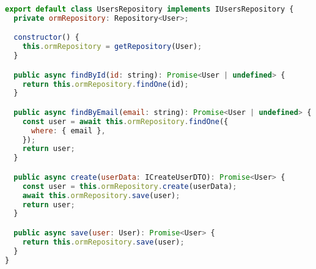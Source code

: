 \begin{lstlisting}[language=JavaScript, caption={UsersRepository.ts},captionpos=b, label=alg:usersrepository]
export default class UsersRepository implements IUsersRepository {
  private ormRepository: Repository<User>;

  constructor() {
    this.ormRepository = getRepository(User);
  }

  public async findById(id: string): Promise<User | undefined> {
    return this.ormRepository.findOne(id);
  }

  public async findByEmail(email: string): Promise<User | undefined> {
    const user = await this.ormRepository.findOne({
      where: { email },
    });
    return user;
  }

  public async create(userData: ICreateUserDTO): Promise<User> {
    const user = this.ormRepository.create(userData);
    await this.ormRepository.save(user);
    return user;
  }

  public async save(user: User): Promise<User> {
    return this.ormRepository.save(user);
  }
}
\end{lstlisting}